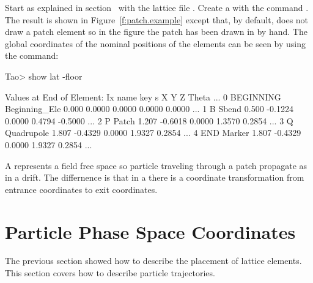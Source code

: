 \documentclass{hitec}
\newcommand{\Section}[1]{\section{#1}\vspace*{-1ex}}
\begin{document}
Start \tao as explained in section~ with the lattice file . Create
a  with the command . The result is shown in
Figure~\ref{f:patch.example} except that, by default, \tao does not draw a patch element so in the
figure the patch has been drawn in by hand. The global coordinates of the nominal positions of the
elements can be seen by using the  command:
\begin{code}
Tao> show lat -floor

      Values at End of Element:
Ix  name      key               s          X         Y         Z     Theta ...
 0  BEGINNING Beginning_Ele  0.000    0.0000    0.0000    0.0000    0.0000 ...
 1  B         Sbend          0.500   -0.1224    0.0000    0.4794   -0.5000 ...
 2  P         Patch          1.207   -0.6018    0.0000    1.3570    0.2854 ...
 3  Q         Quadrupole     1.807   -0.4329    0.0000    1.9327    0.2854 ...
 4  END       Marker         1.807   -0.4329    0.0000    1.9327    0.2854 ...
\end{code}

A  represents a field free space so particle traveling through a patch propagate as in a
drift. The differnence is that in a  there is a coordinate transformation from entrance
coordinates to exit coordinates.

\newpage

\Section{Particle Phase Space Coordinates}

The previous section showed how to describe the placement of lattice elements. This section
covers how to describe particle trajectories. 
\end{document}
